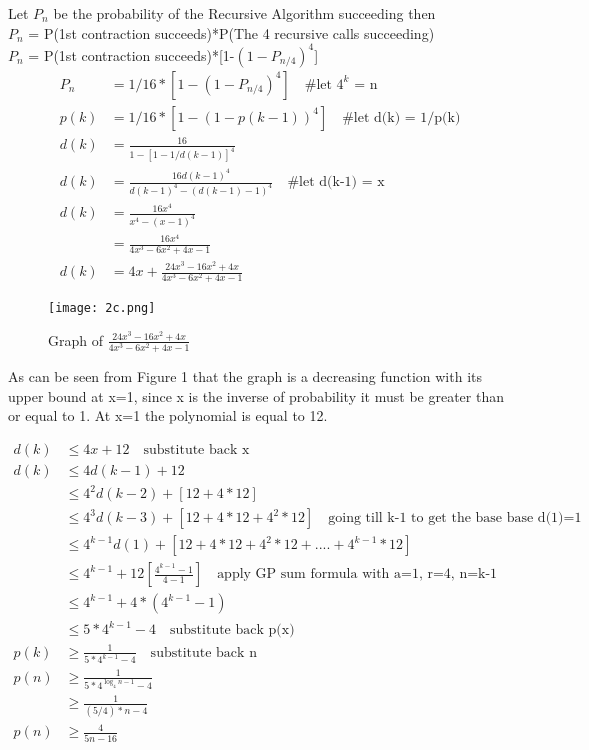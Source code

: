 \documentclass[12pt]{article}
\begin{document}
\vspace{10pt}
Let \(P_n\) be the probability of the Recursive Algorithm succeeding then \\ 
\(P_n\) = P(1st contraction succeeds)*P(The 4 recursive calls succeeding) \\
\(P_n\) = P(1st contraction succeeds)*[1-\((1-P_{n/4})^4\)] \\
\begin{align*}
    P_n &= 1/16*[1-(1-P_{n/4})^4] \quad \text{\# let \(4^k\) = n} \\ 
    p(k) &= 1/16*[1-(1-p(k-1))^4] \quad \text{\# let d(k) = 1/p(k)} \\
    d(k) &= \frac{16}{1-[1-1/d(k-1)]^4} \\
    d(k) &= \frac{16d(k-1)^4}{d(k-1)^4-(d(k-1)-1)^4} \quad \text{\# let d(k-1) = x} \\
    d(k) &= \frac{16x^4}{x^4-(x-1)^4} \\
    &= \frac{16x^4}{4x^3-6x^2+4x-1} \\
    d(k) &= 4x + \frac{24x^3-16x^2+4x}{4x^3-6x^2+4x-1}
 \end{align*}

 \begin{figure}[h]
    \centering
    \texttt{[image: 2c.png]}
    \caption{Graph of $\frac{24x^3-16x^2+4x}{4x^3-6x^2+4x-1}$}
    \label{fig:my_image}
\end{figure}

As can be seen from Figure 1 that the graph is a decreasing function with its upper bound at x=1, since x is the inverse of probability it must be greater than or equal to 1. At x=1 the polynomial is equal to 12. 

\begin{align*}
    d(k) &\leq 4x + 12 \quad \text{substitute back x} \\
    d(k) &\leq 4d(k-1) + 12 \\
    &\leq 4^2d(k-2) + [12 + 4*12] \\ 
    &\leq 4^3d(k-3) + [12 + 4*12 + 4^2*12] \quad \text{going till k-1 to get the base base d(1)=1} \\
    &\leq 4^{k-1}d(1) + [12 + 4*12 + 4^2*12 + .... + 4^{k-1}*12] \\ 
    &\leq 4^{k-1} + 12[\frac{4^{k-1}-1}{4-1}] \quad \text{apply GP sum formula with a=1, r=4, n=k-1} \\
    &\leq 4^{k-1} + 4*(4^{k-1}-1) \\
    &\leq 5*4^{k-1} - 4 \quad \text{substitute back p(x)} \\
    p(k) &\geq \frac{1}{5*4^{k-1} - 4} \quad \text{substitute back n} \\
    p(n) &\geq \frac{1}{5*4^{\log_{4}n-1}-4} \\
    &\geq \frac{1}{(5/4)*n-4} \\
    p(n) &\geq \frac{4}{5n-16} \\
\end{align*}
\end{document}
